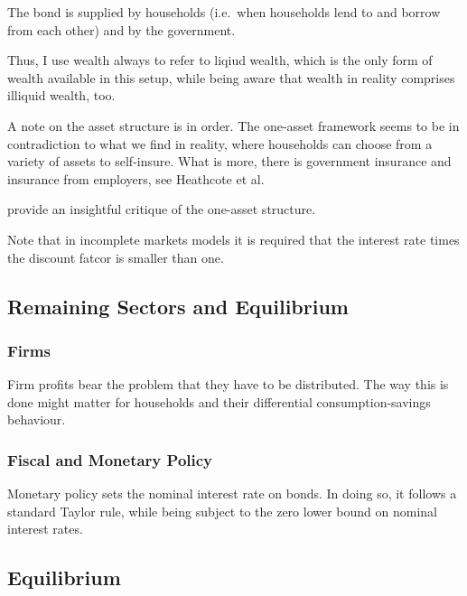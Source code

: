 \documentclass[12pt]{article} %
\numberwithin{equation}{section} %
\begin{document}
The bond is supplied by households (i.e.~when households lend to and borrow from each other) and by the government. %

Thus, I use wealth always to refer to liqiud wealth, which is the only form of wealth available in this setup, while being aware that wealth in reality comprises illiquid wealth, too.

A note on the asset structure is in order. The one-asset framework seems to be in contradiction to what we find in reality, where households can choose from a variety of assets to self-insure. What is more, there is government insurance and insurance from employers, see Heathcote et al.

\textcite{kaplan2018} provide an insightful critique of the one-asset structure. 

Note that in incomplete markets models it is required that the interest rate times the discount fatcor is smaller than one.

\subsection{Remaining Sectors and Equilibrium}
\label{sec:model-sectors}

\subsubsection{Firms}
\label{sec:model-firms}

Firm profits bear the problem that they have to be distributed. The way this is done might matter for households and their differential consumption-savings behaviour. 

\subsubsection{Fiscal and Monetary Policy}
\label{sec:model-policy}

Monetary policy sets the nominal interest rate on bonds. In doing so, it follows a standard Taylor rule, while being subject to the zero lower bound on nominal interest rates. 

\subsection{Equilibrium}
\label{sec:model-eq}

\end{document}
